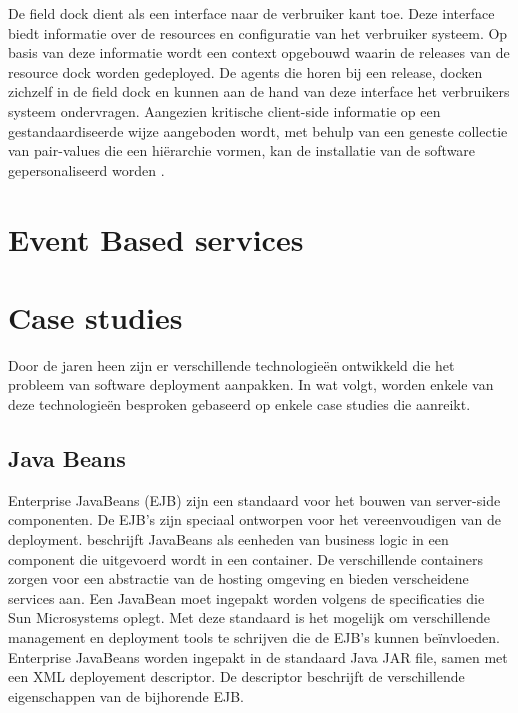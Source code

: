 De field dock dient als een interface naar de verbruiker kant toe.
Deze interface biedt informatie over de resources en configuratie van het verbruiker systeem.
Op basis van deze informatie wordt een context opgebouwd waarin de releases van de resource dock worden gedeployed.
De agents die horen bij een release, docken zichzelf in de field dock en kunnen aan de hand van deze interface het verbruikers systeem ondervragen.
Aangezien kritische client-side informatie op een gestandaardiseerde wijze aangeboden wordt, met behulp van een geneste collectie van pair-values die een hiërarchie vormen, kan de installatie van de software gepersonaliseerd worden \citep{hall1999cooperative}.

\section{Event Based services}



\section{Case studies}\label{sec:caseStudies}
Door de jaren heen zijn er verschillende technologieën ontwikkeld die het probleem van software deployment aanpakken.
In wat volgt, worden enkele van deze technologieën besproken gebaseerd op enkele case studies die \citet{softwareDeployment} aanreikt.

\subsection{Java Beans}
Enterprise JavaBeans (EJB) zijn een standaard voor het bouwen van server-side componenten.
De EJB's zijn speciaal ontworpen voor het vereenvoudigen van de deployment.
\citet{softwareDeployment} beschrijft JavaBeans als eenheden van business logic in een component die uitgevoerd wordt in een container.
De verschillende containers zorgen voor een abstractie van de hosting omgeving en bieden verscheidene services aan.
Een JavaBean moet ingepakt worden volgens de specificaties die Sun Microsystems oplegt.
Met deze standaard is het mogelijk om verschillende management en deployment tools te schrijven die de EJB's kunnen beïnvloeden.
Enterprise JavaBeans worden ingepakt in de standaard Java JAR file, samen met een XML deployement descriptor.
De descriptor beschrijft de verschillende eigenschappen van de bijhorende EJB.


